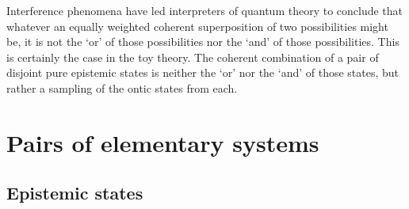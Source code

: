 \documentclass[pra,twocolumn,nofootinbib,showpacs]{revtex4}
\begin{document}

Interference phenomena have led interpreters of quantum theory to conclude
that whatever an equally weighted coherent superposition of two
possibilities might be, it is not the `or' of those possibilities nor the
`and' of those possibilities. This is certainly the case in the toy theory.
The coherent combination of a pair of disjoint pure epistemic states is
neither the `or' nor the `and' of those states, but rather a sampling of the
ontic states from each.

\section{Pairs of elementary systems}

\label{2systems}

\subsection{Epistemic states}

\label{epistemicstates2}
\end{document}
